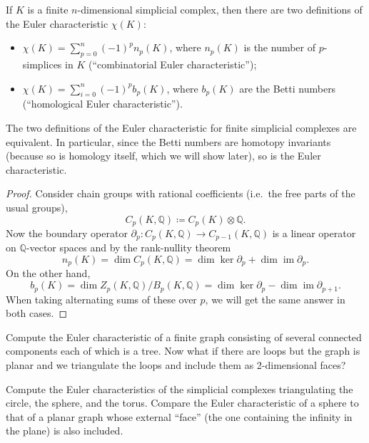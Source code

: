 \documentclass[english,letterpaper]{article}%
\numberwithin{equation}{section}
\numberwithin{figure}{section}
\numberwithin{table}{section}
\theoremstyle{definition}
\theoremstyle{definition}
\theoremstyle{definition}
\theoremstyle{plain}
\theoremstyle{plain}
\theoremstyle{plain}
\theoremstyle{plain}
\theoremstyle{remark}
\theoremstyle{remark}
\newcommand{\bbQ}{\mathbb{Q}}
\DeclareMathOperator{\im}{im}
\begin{document}
\begin{defn}
    If $K$ is a finite $n$-dimensional simplicial complex, then there are two definitions of the Euler characteristic $\chi(K)$:
    \begin{itemize}
        \item $\chi(K)=\sum_{p=0}^n (-1)^p n_p(K)$, where $n_p(K)$ is the number of $p$-simplices in $K$ (``combinatorial Euler characteristic'');
        \item $\chi(K)=\sum_{i=0}^n (-1)^p b_p(K)$, where $b_p(K)$ are the Betti numbers (``homological Euler characteristic'').
    \end{itemize}
\end{defn}

\begin{thm}
    The two definitions of the Euler characteristic for finite simplicial complexes are equivalent. In particular, since the Betti numbers are homotopy invariants (because so is homology itself, which we will show later), so is the Euler characteristic.
\end{thm}
\begin{proof}
    Consider chain groups with rational coefficients (i.e.\ the free parts of the usual groups),
    \[C_p(K,\bbQ)\coloneqq C_p(K)\otimes\bbQ.\]
    Now the boundary operator $\partial_p:C_p(K,\bbQ)\to C_{p-1}(K,\bbQ)$ is a linear operator on $\bbQ$-vector spaces and by the rank-nullity theorem
    \[n_p(K)=\dim C_p(K,\bbQ)=\dim\ker\partial_p+\dim\im\partial_p.\]
    On the other hand,
    \[b_p(K)=\dim Z_p(K,\bbQ)/B_p(K,\bbQ)=\dim\ker\partial_p-\dim\im\partial_{p+1}.\]
    When taking alternating sums of these over $p$, we will get the same answer in both cases.
\end{proof}

\begin{xca}
    Compute the Euler characteristic of a finite graph consisting of several connected components each of which is a tree. Now what if there are loops but the graph is planar and we triangulate the loops and include them as 2-dimensional faces?
\end{xca}

\begin{xca}
    Compute the Euler characteristics of the simplicial complexes triangulating the circle, the sphere, and the torus. Compare the Euler characteristic of a sphere to that of a planar graph whose external ``face'' (the one containing the infinity in the plane) is also included.
\end{xca}
\end{document}
